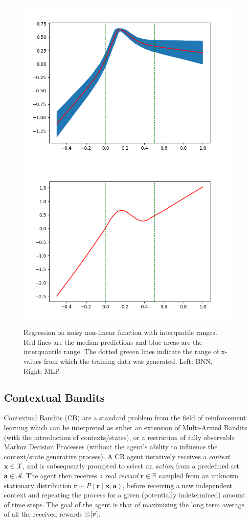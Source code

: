 \documentclass[11pt]{article}
\begin{document}
\begin{figure}
  \centering\includegraphics[width=.45\textwidth]{figures/reg_bnn_extended.png}
  \centering\includegraphics[width=.45\textwidth]{figures/reg_mlp_extended.png}
  \caption{Regression on noisy non-linear function with interquatile ranges.
  Red lines are the median predictions and blue areas are the interquantile range.
	The dotted greeen lines indicate the range of x-values from which the training
  data was generated.
  Left: BNN, Right: MLP.}
  \label{fig:reg_extended}
\end{figure}

\subsection{Contextual Bandits}

Contextual Bandits (CB) are a standard problem from the field of reinforcement
learning which can be interpreted as either an extension of Multi-Armed Bandits
(with the introduction of contexts/states), or a restriction of fully
observable Markov Decision Processes (without the agent's ability to influence
the context/state generative process).  A CB agent iteratively receives
a \emph{context} $\bm x\in\mathcal{X}$, and is subsequently prompted to select an
\emph{action} from a predefined set $\bm a\in\mathcal{A}$.  The agent then receives
a real \emph{reward} $\bm r\in\mathbb{R}$ sampled from an unknown stationary
distribution $\bm r\sim P(\bm r\mid \bm x, \bm a)$, before receiving a new
independent context and repeating the process for a given (potentially
indetermined) amount of time steps.  The goal of the agent is that of
maximizing the long term average of all the received rewards ${\mathbb{E}}\left[\bm
r\right]$.  
\end{document}
